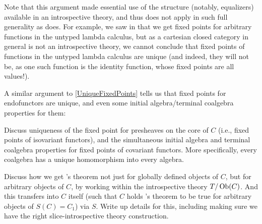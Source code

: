 \begin{observation}
Note that this argument made essential use of the structure (notably, equalizers) available in an introspective theory, and thus does not apply in such full generality as  does. For example, we saw in  that we get fixed points for arbitrary functions in the untyped lambda calculus, but as a cartesian closed category in general is not an introspective theory, we cannot conclude that fixed points of functions in the untyped lambda calculus are unique (and indeed, they will not be, as one such function is the identity function, whose fixed points are all values!).
\end{observation}

A similar argument to \cref{UniqueFixedPoints} tells us that fixed points for endofunctors are unique, and even some initial algebra/terminal coalgebra properties for them: \TODO

\begin{TODOblock}
Discuss uniqueness of the fixed point for presheaves on the core of $C$ (i.e., fixed points of isovariant functors), and the simultaneous initial algebra and terminal coalgebra properties for fixed points of covariant functors. More specifically, every coalgebra has a unique homomorphism into every algebra.
\end{TODOblock}

\begin{TODOblock}
Discuss how we get \Loeb's theorem not just for globally defined objects of $C$, but for arbitrary objects of $C$, by working within the introspective theory $T/\operatorname{Ob}(C)$. And this transfers into $C$ itself (such that $C$ holds \Loeb's theorem to be true for arbitrary objects of $S(C) = C_1$) via $S$. Write up details for this, including making sure we have the right slice-introspective theory construction.
\end{TODOblock}